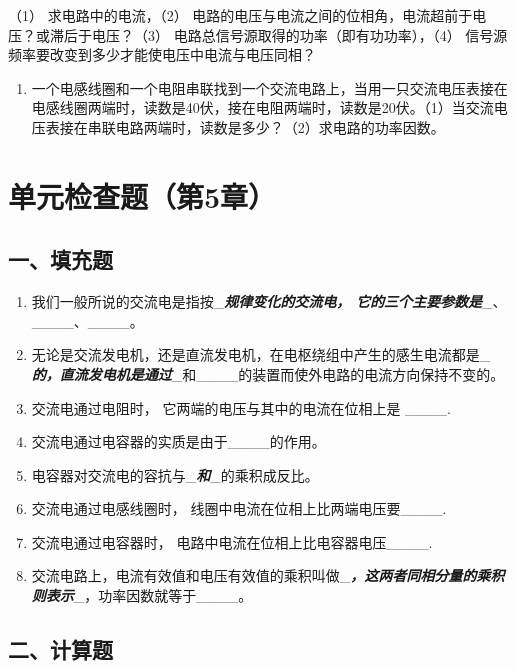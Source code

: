 （1） 求电路中的电流，（2）
电路的电压与电流之间的位相角，电流超前于电压？或滞后于电压？（3）
电路总信号源取得的功率（即有功功率），（4）
信号源频率要改变到多少才能使电压中电流与电压同相？

\begin{enumerate}
\def\labelenumi{\arabic{enumi}.}
\setcounter{enumi}{9}
\tightlist
\item
  一个电感线圈和一个电阻串联找到一个交流电路上，当用一只交流电压表接在电感线圈两端时，读数是40伏，接在电阻两端时，读数是20伏。（1）当交流电压表接在串联电路两端时，读数是多少？（2）求电路的功率因数。
\end{enumerate}

\section{单元检查题（第5章）}\label{ux5355ux5143ux68c0ux67e5ux9898ux7b2c5ux7ae0}

\subsection{一、填充题}\label{ux4e00ux586bux5145ux9898-1}

\begin{enumerate}
\def\labelenumi{\arabic{enumi}.}
\item
  我们一般所说的交流电是指按\_\textbf{\emph{规律变化的交流电，
  它的三个主要参数是}}\_、\_\_\_\_、\_\_\_\_。
\item
  无论是交流发电机，还是直流发电机，在电枢绕组中产生的感生电流都是\_\textbf{\emph{的，直流发电机是通过}}\_和\_\_\_\_的装置而使外电路的电流方向保持不变的。
\item
  交流电通过电阻时， 它两端的电压与其中的电流在位相上是 \_\_\_\_.
\item
  交流电通过电容器的实质是由于\_\_\_\_的作用。
\item
  电容器对交流电的容抗与\_\textbf{\emph{和}}\_的乘积成反比。
\item
  交流电通过电感线圈时， 线圈中电流在位相上比两端电压要\_\_\_\_.
\item
  交流电通过电容器时， 电路中电流在位相上比电容器电压\_\_\_\_.
\item
  交流电路上，电流有效值和电压有效值的乘积叫做\_\textbf{\emph{，这两者同相分量的乘积则表示}}\_，功率因数就等于\_\_\_\_。
\end{enumerate}

\subsection{二、计算题}\label{ux4e8cux8ba1ux7b97ux9898-1}

